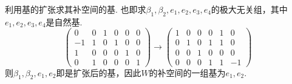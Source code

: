 \documentclass[12pt,fontset=fandol]{ctexart}
\begin{document}
\begin{solve}
\begin{enumerate}
\begin{enumerate}
                                利用基的扩张求其补空间的基. 也即求$\beta_1,\beta_2,e_1,e_2,e_3,e_4$的极大无关组，其中$e_1,e_2,e_3,e_4$是自然基.
                                \[\begin{pmatrix}
                                        0  & 0 & 1 & 0 & 0 & 0 \\
                                        -1 & 1 & 0 & 1 & 0 & 0 \\
                                        1  & 0 & 0 & 0 & 1 & 0 \\
                                        0  & 1 & 0 & 0 & 0 & 1
                                    \end{pmatrix}\rightarrow
                                    \begin{pmatrix}1 & 0 & 0 & 0 & 1 & 0  \\
                 0 & 1 & 0 & 1 & 1 & 0  \\
                 0 & 0 & 1 & 0 & 0 & 0  \\
                 0 & 0 & 0 & 1 & 1 & -1
                                    \end{pmatrix}\]
                                则$\beta_1,\beta_2,e_1,e_2$即是扩张后的基，因此$W$的补空间的一组基为$e_1,e_2$.
                      \end{enumerate}
            \end{enumerate}
\end{solve}
\end{document}
